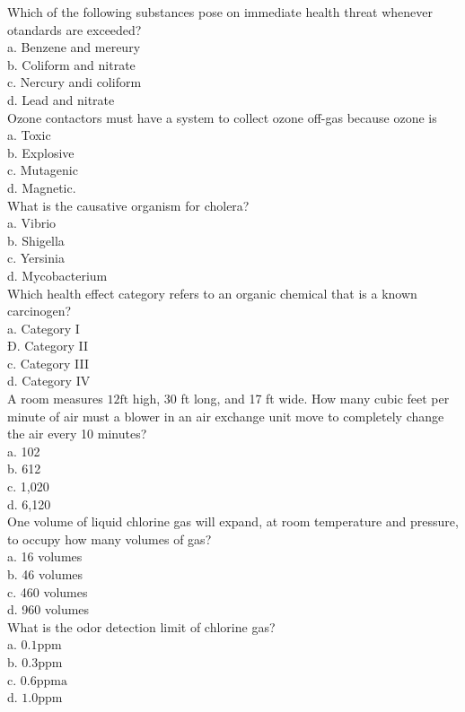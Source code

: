 Which of the following substances pose on immediate health threat whenever otandards are exceeded?\\
a. Benzene and mereury\\
b. Coliform and nitrate\\
c. Nercury andi coliform\\
d. Lead and nitrate\\

Ozone contactors must have a system to collect ozone off-gas because ozone is\\
a. Toxic\\
b. Explosive\\
c. Mutagenic\\
d. Magnetic.\\

What is the causative organism for cholera?\\
a. Vibrio\\
b. Shigella\\
c. Yersinia\\
d. Mycobacterium\\

Which health effect category refers to an organic chemical that is a known carcinogen?\\
a. Category I\\
Đ. Category II\\
c. Category III\\
d. Category IV\\

A room measures $12 \mathrm{ft}$ high, 30 ft long, and 17 ft wide. How many cubic feet per minute of air must a blower in an air exchange unit move to completely change the air every 10 minutes?\\
a. 102\\
b. 612\\
c. 1,020\\
d. 6,120\\

One volume of liquid chlorine gas will expand, at room temperature and pressure, to occupy how many volumes of gas?\\
a. 16 volumes\\
b. 46 volumes\\
c. 460 volumes\\
d. 960 volumes\\

What is the odor detection limit of chlorine gas?\\
a. $0.1 \mathrm{ppm}$\\
b. $0.3 \mathrm{ppm}$\\
c. $0.6 \mathrm{ppma}$\\
d. $1.0 \mathrm{ppm}$\\

